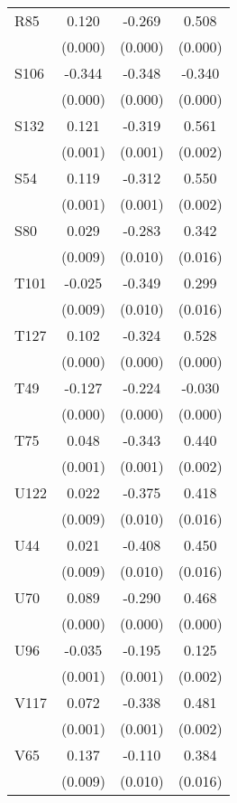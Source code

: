 \begin{table}[htbp]
\begin{tabular}{l*{3}{c}}
R85             &    0.120&   -0.269&    0.508\\
                &  (0.000)&  (0.000)&  (0.000)\\
S106            &   -0.344&   -0.348&   -0.340\\
                &  (0.000)&  (0.000)&  (0.000)\\
S132            &    0.121&   -0.319&    0.561\\
                &  (0.001)&  (0.001)&  (0.002)\\
S54             &    0.119&   -0.312&    0.550\\
                &  (0.001)&  (0.001)&  (0.002)\\
S80             &    0.029&   -0.283&    0.342\\
                &  (0.009)&  (0.010)&  (0.016)\\
T101            &   -0.025&   -0.349&    0.299\\
                &  (0.009)&  (0.010)&  (0.016)\\
T127            &    0.102&   -0.324&    0.528\\
                &  (0.000)&  (0.000)&  (0.000)\\
T49             &   -0.127&   -0.224&   -0.030\\
                &  (0.000)&  (0.000)&  (0.000)\\
T75             &    0.048&   -0.343&    0.440\\
                &  (0.001)&  (0.001)&  (0.002)\\
U122            &    0.022&   -0.375&    0.418\\
                &  (0.009)&  (0.010)&  (0.016)\\
U44             &    0.021&   -0.408&    0.450\\
                &  (0.009)&  (0.010)&  (0.016)\\
U70             &    0.089&   -0.290&    0.468\\
                &  (0.000)&  (0.000)&  (0.000)\\
U96             &   -0.035&   -0.195&    0.125\\
                &  (0.001)&  (0.001)&  (0.002)\\
V117            &    0.072&   -0.338&    0.481\\
                &  (0.001)&  (0.001)&  (0.002)\\
V65             &    0.137&   -0.110&    0.384\\
                &  (0.009)&  (0.010)&  (0.016)\\

\end{tabular}
\end{table}

